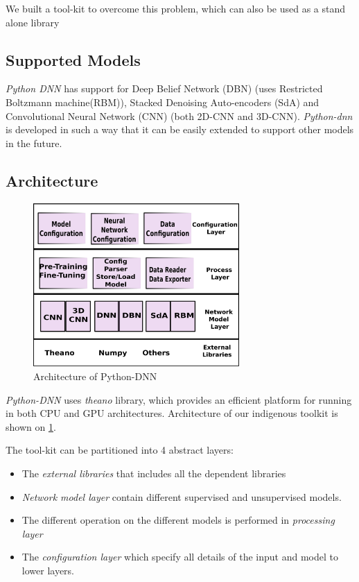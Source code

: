 We built a tool-kit to overcome this problem, which can also be used as a stand alone library


\subsection{Supported Models}
\label{sec:python-dnnModels}
\textit{Python DNN}  has support  for Deep Belief Network (DBN) \cite{hinton2002training} (uses Restricted Boltzmann machine(RBM)), Stacked Denoising Auto-encoders (SdA) \cite{vincent2010stacked} and Convolutional Neural Network (CNN) \cite{lecun1998gradient} (both 2D-CNN and 3D-CNN). \textit{Python-dnn} is developed in such a way that it can be easily extended to support other models in the future.

\subsection{Architecture}

\begin{figure}[ht]
\centering
\includegraphics[width=0.7\textwidth]{./imgs/Python-DNNArch.eps}
\caption{Architecture of Python-DNN}
\label{fig:pydnn-arch}
\end{figure}

\textit{Python-DNN} uses \emph{theano} library, which provides an efficient platform for running in both CPU and GPU architectures. Architecture of our indigenous toolkit is shown on \ref{fig:pydnn-arch}. 

\noindent The tool-kit can be partitioned into 4 abstract layers:
\begin{itemize}
\item The \textit{external libraries} that includes all the dependent libraries
\item \textit{Network model layer} contain different supervised and unsupervised models.
\item The different operation on the different models is performed in \textit{processing layer}
\item The \textit{configuration layer} which specify all details of the input and model to lower layers.
\end{itemize}

